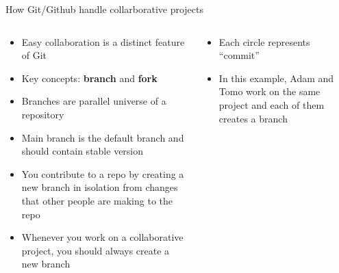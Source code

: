 \documentclass[handout,pdftex,10pt,aspectratio=169]{beamer}
\begin{document}
\begin{frame}{How Git/Github handle collarborative projects}
  \begin{columns}[c]
    \begin{column}{0.55\linewidth}
      \begin{itemize}[<+->]\setlength\itemsep{10pt}
        \item Easy collaboration is a distinct feature of Git
        \item Key concepts: \textbf{branch} and \textbf{fork}
        \item Branches are parallel universe of a repository
        \item Main branch is the default branch and should contain stable version
        \item You contribute to a repo by creating a new branch in isolation from changes 
        that other people are making to the repo
        \item Whenever you work on a collaborative project, you should always create a new branch
      \end{itemize}
    \end{column} \hfill
    \begin{column}{0.44\linewidth}
      \begin{itemize}
        \item<7-> Each circle represents ``commit''
        \item<8-> In this example, Adam and Tomo work on the same project and 
        each of them creates a branch
      \end{itemize}
    \end{column}
  \end{columns}
\end{frame}
\end{document}
